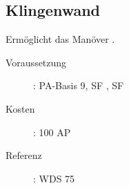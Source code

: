 \subsection{Klingenwand}
\label{sf.klingenwand}
Ermöglicht das Manöver .
\begin{description}
    \item[Voraussetzung]:
        PA-Basis 9, SF , SF 
    \item [Kosten]:
        100 AP
    \item [Referenz]:
        WDS 75
\end{description}
